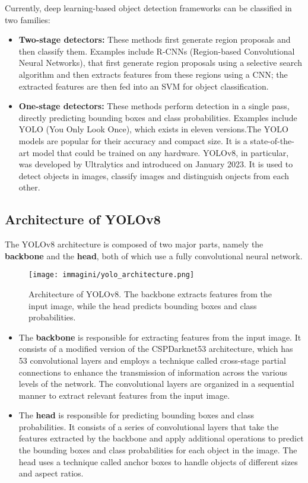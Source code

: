 Currently, deep learning-based object detection frameworks can be classified in two families: 
\begin{itemize}
    \item \textbf{Two-stage detectors:} These methods first generate region proposals and then classify them. Examples include R-CNNs (Region-based Convolutional Neural Networks), that first generate region proposals using a selective search algorithm and then extracts features from these regions using a CNN; the extracted features are then fed into an SVM for object classification. 
    \item \textbf{One-stage detectors:} These methods perform detection in a single pass, directly predicting bounding boxes and class probabilities. Examples include YOLO (You Only Look Once), which exists in eleven versions.The YOLO models are popular for their accuracy and compact size. It is a state-of-the-art model that could be trained on any hardware. YOLOv8, in particular, was developed by Ultralytics and introduced on January 2023. It is used to detect objects in images, classify images and distinguish onjects from each other. 

\end{itemize}

\subsection{Architecture of YOLOv8}
The YOLOv8 architecture is composed of two major parts, namely the \textbf{backbone} and the \textbf{head}, both of which use a fully convolutional neural network. 
\begin{figure}
    \centering
    \texttt{[image: immagini/yolo\_architecture.png]}
    \caption{Architecture of YOLOv8. The backbone extracts features from the input image, while the head predicts bounding boxes and class probabilities.}
    \label{fig:yolo_architecture}
\end{figure}
\begin{itemize}
    \item The \textbf{backbone} is responsible for extracting features from the input image. It consists of a modified version of the CSPDarknet53 architecture, which has 53 convolutional layers and employs a technique called cross-stage partial connections to enhance the transmission of information across the various levels of the network. The convolutional layers are organized in a sequential manner to extract relevant features from the input image.
    \item The \textbf{head} is responsible for predicting bounding boxes and class probabilities. It consists of a series of convolutional layers that take the features extracted by the backbone and apply additional operations to predict the bounding boxes and class probabilities for each object in the image. The head uses a technique called anchor boxes to handle objects of different sizes and aspect ratios.
\end{itemize}


